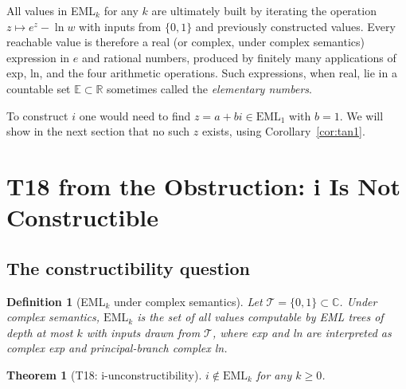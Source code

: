 \documentclass[11pt]{article}
\newtheorem{theorem}{Theorem}[section]
\newtheorem{definition}{Definition}[section]
\begin{document}
All values in EML$_k$ for any $k$ are ultimately built by iterating the operation
$z \mapsto e^z - \ln w$ with inputs from $\{0,1\}$ and previously constructed values.
Every reachable value is therefore a real (or complex, under complex semantics)
expression in $e$ and rational numbers, produced by finitely many applications of
exp, ln, and the four arithmetic operations.  Such expressions, when real, lie in
a countable set $\mathbb{E} \subset \mathbb{R}$ sometimes called the
\emph{elementary numbers}.

To construct $i$ one would need to find $z = a + bi \in \mathrm{EML}_1$ with
$b = 1$.  We will show in the next section that no such $z$ exists, using
Corollary~\ref{cor:tan1}.

\section{T18 from the Obstruction: i Is Not Constructible}

\subsection{The constructibility question}

\begin{definition}[EML$_k$ under complex semantics]
\label{def:eml_complex}
Let $\mathcal{T} = \{0, 1\} \subset \mathbb{C}$.
Under complex semantics, $\mathrm{EML}_k$ is the set of all values computable
by EML trees of depth at most $k$ with inputs drawn from $\mathcal{T}$, where
exp and ln are interpreted as complex exp and principal-branch complex ln.
\end{definition}

\begin{theorem}[T18: i-unconstructibility]
\label{thm:T18}
$i \notin \mathrm{EML}_k$ for any $k \geq 0$.
\end{theorem}
\end{document}
